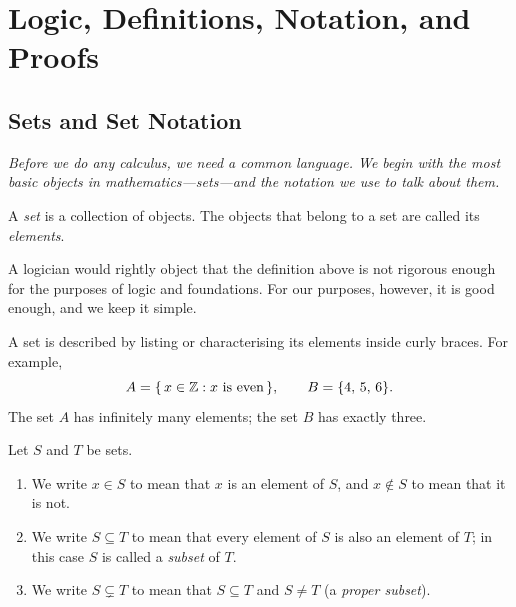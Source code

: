 \chapter{Logic, Definitions, Notation, and Proofs}

\section{Sets and Set Notation}
\label{sec:1.1}

\textit{Before we do any calculus, we need a common language.  We begin with the most basic objects in mathematics---sets---and the notation we use to talk about them.}

\begin{definition}[Set]
\label{def:1-1}
A \emph{set} is a collection of objects.  The objects that belong to a set are called its \emph{elements}.
\end{definition}

\begin{remark}
A logician would rightly object that the definition above is not rigorous enough for the purposes of logic and foundations.  For our purposes, however, it is good enough, and we keep it simple.
\end{remark}

A set is described by listing or characterising its elements inside curly braces.  For example,
\[
  A = \{\, x \in \mathbb{Z} : x \text{ is even}\,\}, \qquad
  B = \{4,\, 5,\, 6\}.
\]
The set $A$ has infinitely many elements; the set $B$ has exactly three.

\begin{definition}
\label{def:1-2}
Let $S$ and $T$ be sets.
\begin{enumerate}[label=(\roman*)]
  \item We write $x \in S$ to mean that $x$ is an element of $S$, and $x \notin S$ to mean that it is not.
  \item We write $S \subseteq T$ to mean that every element of $S$ is also an element of $T$; in this case $S$ is called a \emph{subset} of $T$.
  \item We write $S \subsetneq T$ to mean that $S \subseteq T$ and $S \neq T$ (a \emph{proper subset}).
\end{enumerate}
\end{definition}

